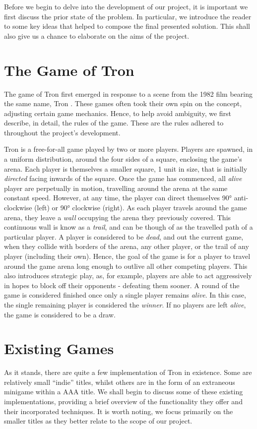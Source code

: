 \documentclass[class=article, crop=false]{standalone}
\begin{document}
	Before we begin to delve into the development of our project, it is important we first discuss the prior state of the problem. In particular, we introduce the reader to some key ideas that helped to compose the final presented solution. This shall also give us a chance to elaborate on the aims of the project.

	\section{The Game of Tron}
		The game of Tron first emerged in response to a scene from the 1982 film bearing the same name, Tron \parencite{TronLightCycleBattle}. These games often took their own spin on the concept, adjusting certain game mechanics. Hence, to help avoid ambiguity, we first describe, in detail, the rules of the game. These are the rules adhered to throughout the project's development.

		Tron is a free-for-all game played by two or more players. Players are spawned, in a uniform distribution, around the four sides of a square, enclosing the game's arena. Each player is themselves a smaller square, 1 unit in size, that is initially \emph{directed} facing inwards of the square. Once the game has commenced, all \emph{alive} player are perpetually in motion, travelling around the arena at the same constant speed. However, at any time, the player can direct themselves 90\si{\degree} anti-clockwise (left) or 90\si{\degree} clockwise (right). As each player travels around the game arena, they leave a \emph{wall} occupying the arena they previously covered. This continuous wall is know as a \emph{trail}, and can be though of as the travelled path of a particular player. A player is considered to be \emph{dead}, and out the current game, when they collide with borders of the arena, any other player, or the trail of any player (including their own). Hence, the goal of the game is for a player to travel around the game arena long enough to outlive all other competing players. This also introduces strategic play, as, for example, players are able to act aggressively in hopes to block off their opponents - defeating them sooner. A round of the game is considered finished once only a single player remains \emph{alive}. In this case, the single remaining player is considered the \emph{winner}. If no players are left \emph{alive}, the game is considered to be a draw.

	\section{Existing Games} \label{sec:existingGames}
		As it stands, there are quite a few implementation of Tron in existence. Some are relatively small \enquote{indie} titles, whilst others are in the form of an extraneous minigame within a AAA title. We shall begin to discuss some of these existing implementations, providing a brief overview of the functionality they offer and their incorporated techniques. It is worth noting, we focus primarily on the smaller titles as they better relate to the scope of our project.
\end{document}
